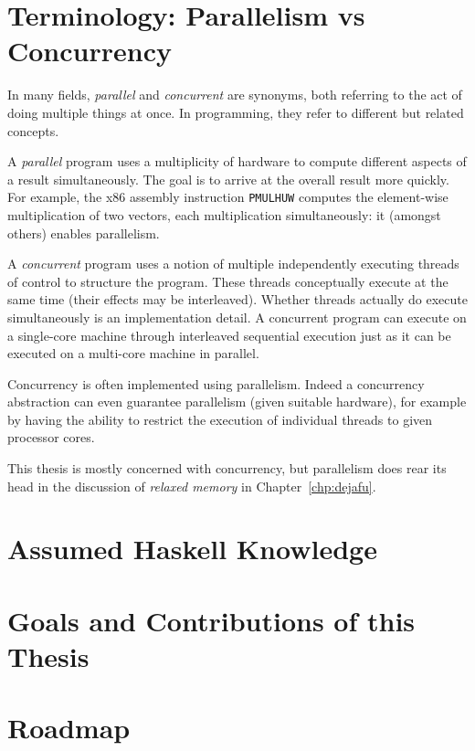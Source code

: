 \blindtext

\section{Terminology: Parallelism vs Concurrency}
\label{sec:intro-parconc}

In many fields, \emph{parallel} and \emph{concurrent} are synonyms, both referring to the act of
doing multiple things at once.  In programming, they refer to different but related concepts.

A \emph{parallel} program uses a multiplicity of hardware to compute different aspects of a result
simultaneously.  The goal is to arrive at the overall result more quickly.  For example, the x86
assembly instruction \verb#PMULHUW# computes the element-wise multiplication of two vectors, each
multiplication simultaneously: it (amongst others) enables parallelism.

A \emph{concurrent} program uses a notion of multiple independently executing threads of control to
structure the program.  These threads conceptually execute at the same time (their effects may be
interleaved).  Whether threads actually do execute simultaneously is an implementation detail.  A
concurrent program can execute on a single-core machine through interleaved sequential execution
just as it can be executed on a multi-core machine in parallel.

Concurrency is often implemented using parallelism.  Indeed a concurrency abstraction can even
guarantee parallelism (given suitable hardware), for example by having the ability to restrict the
execution of individual threads to given processor cores.

This thesis is mostly concerned with concurrency, but parallelism does rear its head in the
discussion of \emph{relaxed memory} in Chapter~\ref{chp:dejafu}.

\section{Assumed Haskell Knowledge}
\label{sec:intro-assumed}
\blindtext

\section{Goals and Contributions of this Thesis}
\label{sec:intro-contributions}
\blindtext

\section{Roadmap}
\label{sec:intro-roadmap}

